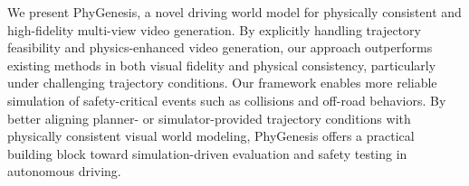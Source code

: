 \documentclass[runningheads]{llncs}
\begin{document}
We present PhyGenesis, a novel driving world model for physically consistent and high-fidelity multi-view video generation. By explicitly handling trajectory feasibility and physics-enhanced video generation, our approach outperforms existing methods in both visual fidelity and physical consistency, particularly under challenging trajectory conditions.
Our framework enables more reliable simulation of safety-critical events such as collisions and off-road behaviors. By better aligning planner- or simulator-provided trajectory conditions with physically consistent visual world modeling, PhyGenesis offers a practical building block toward simulation-driven evaluation and safety testing in autonomous driving.
\end{document}
